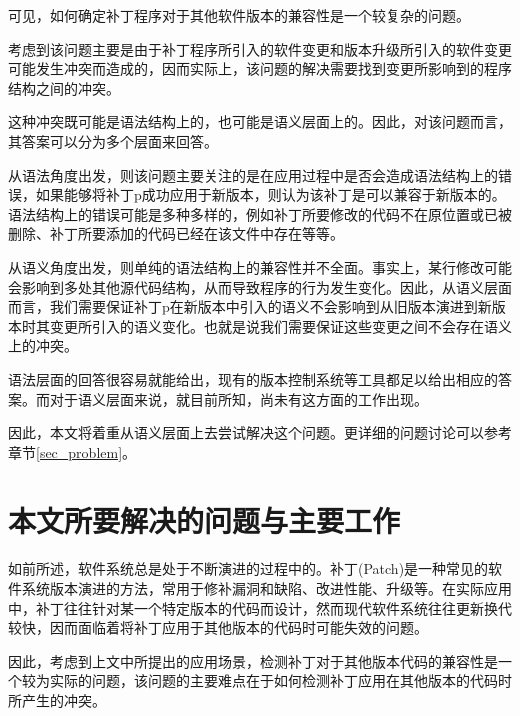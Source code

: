 可见，如何确定补丁程序对于其他软件版本的兼容性是一个较复杂的问题。

考虑到该问题主要是由于补丁程序所引入的软件变更和版本升级所引入的软件变更可能发生冲突而造成的，因而实际上，该问题的解决需要找到变更所影响到的程序结构之间的冲突。

这种冲突既可能是语法结构上的，也可能是语义层面上的。因此，对该问题而言，其答案可以分为多个层面来回答。

从语法角度出发，则该问题主要关注的是在应用过程中是否会造成语法结构上的错误，如果能够将补丁p成功应用于新版本，则认为该补丁是可以兼容于新版本的。语法结构上的错误可能是多种多样的，例如补丁所要修改的代码不在原位置或已被删除、补丁所要添加的代码已经在该文件中存在等等。

从语义角度出发，则单纯的语法结构上的兼容性并不全面。事实上，某行修改可能会影响到多处其他源代码结构，从而导致程序的行为发生变化。因此，从语义层面而言，我们需要保证补丁p在新版本中引入的语义不会影响到从旧版本演进到新版本时其变更所引入的语义变化。也就是说我们需要保证这些变更之间不会存在语义上的冲突。

语法层面的回答很容易就能给出，现有的版本控制系统等工具都足以给出相应的答案。而对于语义层面来说，就目前所知，尚未有这方面的工作出现。

因此，本文将着重从语义层面上去尝试解决这个问题。更详细的问题讨论可以参考章节\ref {sec_problem}。


\section{本文所要解决的问题与主要工作}

如前所述，软件系统总是处于不断演进的过程中的。补丁(Patch)是一种常见的软件系统版本演进的方法，常用于修补漏洞和缺陷、改进性能、升级等。在实际应用中，补丁往往针对某一个特定版本的代码而设计，然而现代软件系统往往更新换代较快，因而面临着将补丁应用于其他版本的代码时可能失效的问题。


因此，考虑到上文中所提出的应用场景，检测补丁对于其他版本代码的兼容性是一个较为实际的问题，该问题的主要难点在于如何检测补丁应用在其他版本的代码时所产生的冲突。



